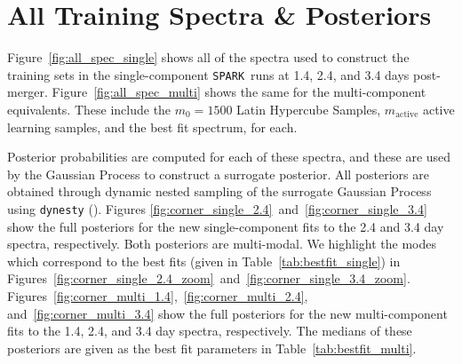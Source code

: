 \documentclass[twocolumn,twocolappendix]{aastex63}
\def\SPARK{\texttt{SPARK}}
\newcommand\redbf[1]{\textbf{\textcolor{red}{#1}}}
\begin{document}
\appendix{}

\section{All Training Spectra \& Posteriors}\label{app:allspec_posteriors}

Figure~\ref{fig:all_spec_single} shows all of the spectra used to construct the training sets in the single-component \SPARK~runs at 1.4, 2.4, and 3.4 days post-merger. Figure~\ref{fig:all_spec_multi} shows the same for the multi-component equivalents. These include the $m_0 = 1500$ Latin Hypercube Samples, $m_{\mathrm{active}}$ active learning samples, and the best fit spectrum, for each.

Posterior probabilities are computed for each of these spectra, and these are used by the Gaussian Process to construct a surrogate posterior. All posteriors are obtained through dynamic nested sampling of the surrogate Gaussian Process using \texttt{dynesty} (\citealt{speagle20}). Figures \ref{fig:corner_single_2.4}~and~\ref{fig:corner_single_3.4} show the full posteriors for the new single-component fits to the 2.4 and 3.4 day spectra, respectively. Both posteriors are multi-modal. We highlight the modes which correspond to the best fits (given in Table~\ref{tab:bestfit_single}) in Figures~\ref{fig:corner_single_2.4_zoom}~and~\ref{fig:corner_single_3.4_zoom}. Figures~\ref{fig:corner_multi_1.4},~\ref{fig:corner_multi_2.4}, and~\ref{fig:corner_multi_3.4} show the full posteriors for the new multi-component fits to the 1.4, 2.4, and 3.4 day spectra, respectively. The medians of these posteriors are given as the best fit parameters in Table~\ref{tab:bestfit_multi}. %
\end{document}
